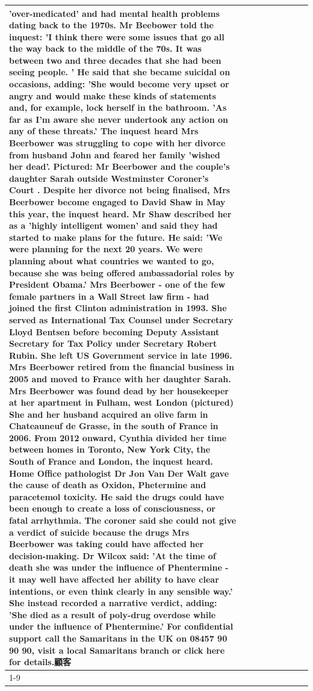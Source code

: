 \begin{table}[H]
\begin{tabular}{lllrlllll}
'over-medicated' and had mental health problems dating back to the 1970s. Mr Beebower told the inquest: 'I think there were some issues that go all the way back to the middle of the 70s. It was between two and three decades that she had been seeing people. ' He said that she became suicidal on occasions, adding: 'She would become very upset or angry and would make these kinds of statements and, for example, lock herself in the bathroom. 'As far as I'm aware she never undertook any action on any of these threats.' The inquest heard Mrs Beerbower was struggling to cope with her divorce from husband John and feared her family 'wished her dead'. Pictured: Mr Beerbower and the couple's daughter Sarah outside Westminster Coroner's Court . Despite her divorce not being finalised, Mrs Beerbower become engaged to David Shaw in May this year, the inquest heard. Mr Shaw described her as a 'highly intelligent women' and said they had started to make plans for the future. He said: 'We were planning for the next 20 years. We were planning about what countries we wanted to go, because she was being offered ambassadorial roles by President Obama.' Mrs Beerbower - one of the few female partners in a Wall Street law firm - had joined the first Clinton administration in 1993. She served as International Tax Counsel under Secretary Lloyd Bentsen before becoming Deputy Assistant Secretary for Tax Policy under Secretary Robert Rubin. She left US Government service in late 1996. Mrs Beerbower retired from the financial business in 2005 and moved to France with her daughter Sarah. Mrs Beerbower was found dead by her housekeeper at her apartment in Fulham, west London (pictured) She and her husband acquired an olive farm in Chateauneuf de Grasse, in the south of France in 2006. From 2012 onward, Cynthia divided her time between homes in Toronto, New York City, the South of France and London, the inquest heard. Home Office pathologist Dr Jon Van Der Walt gave the cause of death as Oxidon, Phetermine and paracetemol toxicity. He said the drugs could have been enough to create a loss of consciousness, or fatal arrhythmia. The coroner said she could not give a verdict of suicide because the drugs Mrs Beerbower was taking could have affected her decision-making. Dr Wilcox said: 'At the time of death she was under the influence of Phentermine - it may well have affected her ability to have clear intentions, or even think clearly in any sensible way.' She instead recorded a narrative verdict, adding: 'She died as a result of poly-drug overdose while under the influence of Phentermine.' For confidential support call the Samaritans in the UK on 08457 90 90 90, visit a local Samaritans branch or click here for details.顧客 \\
\cline{1-9}
\bottomrule
\end{tabular}
\end{table}
